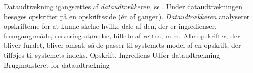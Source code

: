 {Dataudtrækning igangsættes af \textit{dataudtrækkeren}, se . Under dataudtrækningen besøges opskrifter på en opskriftsside (én af gangen). \textit{Dataudtrækkeren} analyserer opskrifterne for at kunne skelne hvilke dele af den, der er ingredienser, fremgangsmåde, serveringsstørrelse, billede af retten, m.m. Alle opskrifter, der bliver fundet, bliver omsat, så de passer til systemets model af en opskrift, der tilføjes til systemets indeks.}
{Opskrift, Ingrediens}
{Udfør dataudtrækning}
{Brugmønsteret for dataudtrækning}
